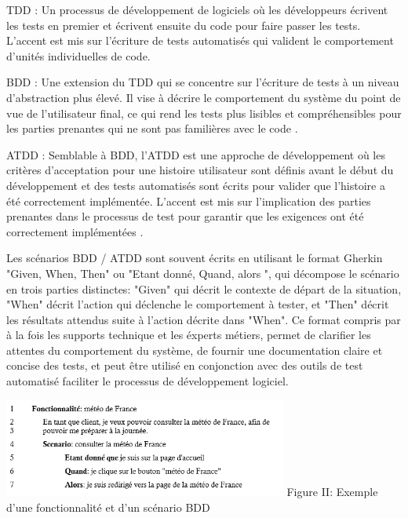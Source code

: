 TDD : Un processus de développement de logiciels où les développeurs écrivent les tests en premier et écrivent ensuite du code pour faire passer les tests. L'accent est mis sur l'écriture de tests automatisés qui valident le comportement d'unités individuelles de code.

BDD : Une extension du TDD qui se concentre sur l'écriture de tests à un niveau d'abstraction plus élevé. Il vise à décrire le comportement du système du point de vue de l'utilisateur final, ce qui rend les tests plus lisibles et compréhensibles pour les parties prenantes qui ne sont pas familières avec le code \parencite{Bdd}.

ATDD : Semblable à BDD, l'ATDD est une approche de développement où les critères d'acceptation pour une histoire utilisateur sont définis avant le début du développement et des tests automatisés sont écrits pour valider que l'histoire a été correctement implémentée. L'accent est mis sur l'implication des parties prenantes dans le processus de test pour garantir que les exigences ont été correctement implémentées \parencite{AtddBook}.


Les scénarios BDD / ATDD sont souvent écrits en utilisant le format Gherkin "Given, When, Then" ou "Etant donné, Quand, alors ", qui décompose le scénario en trois parties distinctes: "Given" qui décrit le contexte de départ de la situation, "When" décrit l'action qui déclenche le comportement à tester, et "Then" décrit les résultats attendus suite à l'action décrite dans "When". Ce format compris par à la fois les supports technique et les éxperts métiers, permet de clarifier les attentes du comportement du système, de fournir une documentation claire et concise des tests, et peut être utilisé en conjonction avec des outils de test automatisé faciliter le processus de développement logiciel.
\begin{center}
    \includegraphics[width=0.7\textwidth]{feature.png}
    \linebreak
    Figure II: Exemple d'une fonctionnalité et d'un scénario BDD
\end{center}

